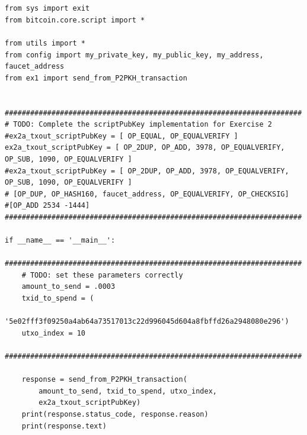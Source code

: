 \documentclass[letterpaper]{article}
\begin{document}
\section{}
\begin{verbatim}
from sys import exit
from bitcoin.core.script import *

from utils import *
from config import my_private_key, my_public_key, my_address, faucet_address
from ex1 import send_from_P2PKH_transaction


######################################################################
# TODO: Complete the scriptPubKey implementation for Exercise 2
#ex2a_txout_scriptPubKey = [ OP_EQUAL, OP_EQUALVERIFY ] 
ex2a_txout_scriptPubKey = [ OP_2DUP, OP_ADD, 3978, OP_EQUALVERIFY, OP_SUB, 1090, OP_EQUALVERIFY ] 
#ex2a_txout_scriptPubKey = [ OP_2DUP, OP_ADD, 3978, OP_EQUALVERIFY, OP_SUB, 1090, OP_EQUALVERIFY ] 
# [OP_DUP, OP_HASH160, faucet_address, OP_EQUALVERIFY, OP_CHECKSIG]
#[OP_ADD 2534 -1444]
######################################################################

if __name__ == '__main__':
    ######################################################################
    # TODO: set these parameters correctly
    amount_to_send = .0003
    txid_to_spend = (
        '5e02fff3f09250a4ab64a73517013c22d996045d604a8fbffd26a2948080e296')
    utxo_index = 10
    ######################################################################

    response = send_from_P2PKH_transaction(
        amount_to_send, txid_to_spend, utxo_index,
        ex2a_txout_scriptPubKey)
    print(response.status_code, response.reason)
    print(response.text)
\end{verbatim}


\end{document}
